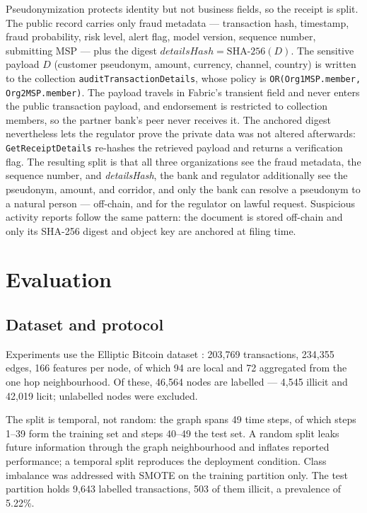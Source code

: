 \documentclass[conference]{IEEEtran}
\begin{document}
Pseudonymization protects identity but not business fields, so the receipt is
split. The public record carries only fraud metadata --- transaction hash,
timestamp, fraud probability, risk level, alert flag, model version, sequence
number, submitting MSP --- plus the digest
$\mathit{detailsHash} = \mathrm{SHA\text{-}256}(D)$. The sensitive payload $D$
(customer pseudonym, amount, currency, channel, country) is written to the
collection \texttt{auditTransactionDetails}, whose policy is
\texttt{OR(Org1MSP.member, Org2MSP.member)}. The payload travels in Fabric's
transient field and never enters the public transaction payload, and endorsement
is restricted to collection members, so the partner bank's peer never receives
it. The anchored digest nevertheless lets the regulator prove the private data
was not altered afterwards: \texttt{GetReceiptDetails} re-hashes the retrieved
payload and returns a verification flag. The resulting split is that all three
organizations see the fraud metadata, the sequence number, and
\emph{detailsHash}, the bank and regulator additionally see the pseudonym,
amount, and corridor, and only the bank can resolve a pseudonym to a natural
person --- off-chain, and for the regulator on lawful request. Suspicious
activity reports follow the same pattern: the document is stored off-chain and only its SHA-256 digest and object
key are anchored at filing time.



\section{Evaluation}

\subsection{Dataset and protocol}

Experiments use the Elliptic Bitcoin dataset \cite{weber2019aml}: 203{,}769
transactions, 234{,}355 edges, 166 features per node, of which 94 are local and
72 aggregated from the one hop neighbourhood. Of these, 46{,}564 nodes are
labelled --- 4{,}545 illicit and 42{,}019 licit; unlabelled nodes were excluded.

The split is temporal, not random: the graph spans 49 time steps, of which
steps 1--39 form the training set and steps 40--49 the test set. A random split
leaks future information through the graph
neighbourhood and inflates reported performance; a temporal split reproduces the
deployment condition. Class imbalance was addressed with SMOTE
\cite{chawla2002smote} on the training partition only. The test partition holds
9{,}643 labelled transactions, 503 of them illicit, a prevalence of 5.22\%.
\end{document}
